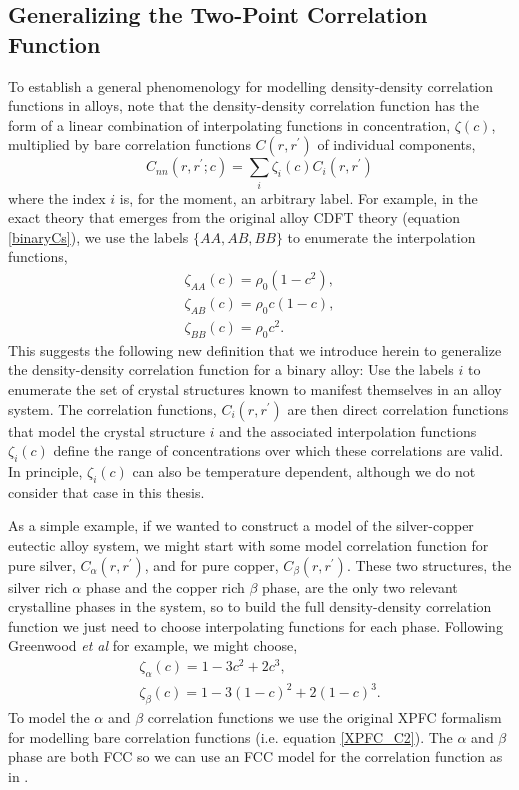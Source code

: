 \documentclass[showkeys, prb, reprint]{revtex4-1}
\begin{document}
\subsection{Generalizing the Two-Point Correlation Function} %

To establish a general phenomenology for modelling density-density correlation
functions in alloys, note that the density-density correlation function has the
form of a linear combination of interpolating functions in concentration,
$\zeta(c)$, multiplied by bare correlation functions $C(r, r^\prime)$ of
individual components,
%
\begin{equation}
    C_{nn}(r, r^\prime; c) = \sum_i \zeta_i(c) C_i(r, r^\prime)
\end{equation}
%
where the index $i$ is, for the moment, an arbitrary label. For example, in the
exact theory that emerges from the original alloy CDFT theory (equation
\ref{binaryCs}), we use the labels $\lbrace AA, AB, BB\rbrace$ to enumerate the
interpolation functions, 
%
\begin{gather}
    \zeta_{AA}(c) = \rho_0 (1 - c^2), \\
    \zeta_{AB}(c) = \rho_0 c (1 - c ), \\
    \zeta_{BB}(c) = \rho_0 c^2.
\end{gather}
%
This suggests the following new definition that we introduce herein to
generalize the density-density correlation function for a binary alloy: Use the
labels $i$ to enumerate the set of crystal structures known to manifest
themselves in an alloy system. The correlation functions, $C_i(r, r^\prime)$
are then direct correlation functions that model the crystal structure $i$ and
the associated interpolation functions $\zeta_i(c)$ define the range of
concentrations over which these correlations are valid. In principle,
$\zeta_i(c)$ can also be temperature dependent, although we do not consider
that case in this thesis.

As a simple example, if we wanted to construct a model of the silver-copper
eutectic alloy system, we might start with some model correlation function for
pure silver, $C_\alpha(r, r^\prime)$, and for pure copper, $C_\beta(r,
r^\prime)$. These two structures, the silver rich $\alpha$ phase and the copper
rich $\beta$ phase, are the only two relevant crystalline phases in the system,
so to build the full density-density correlation function we just need to
choose interpolating functions for each phase. Following Greenwood \textit{et
al} for example, we might choose,
%
\begin{gather}
    \zeta_\alpha(c) = 1 - 3c^2 + 2c^3, \\
    \zeta_\beta(c) = 1 - 3 (1 - c)^2 + 2(1 - c)^3.
\end{gather}
%
To model the $\alpha$ and $\beta$ correlation functions we use the original
XPFC formalism for modelling bare correlation functions (i.e. equation
\ref{XPFC_C2}). The $\alpha$ and $\beta$ phase are both FCC
\cite{SUBRAMANIAN93} so we can use an FCC model for the correlation function as
in \cite{GREENWOOD10}.
\end{document}
